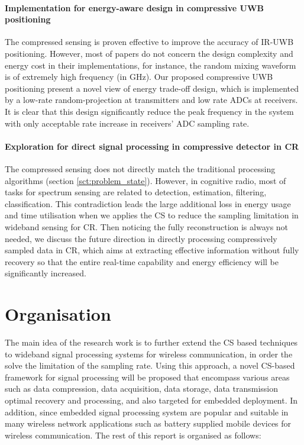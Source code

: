 \paragraph{Implementation for energy-aware design in compressive UWB positioning} 
The compressed sensing is proven effective to improve the accuracy of IR-UWB positioning. However, most of papers do not concern the design complexity and energy cost in their implementations, for instance, the random mixing waveform is of extremely high frequency (in GHz). Our proposed compressive UWB positioning present a novel view of energy trade-off design, which is implemented by a low-rate random-projection at transmitters and low rate ADCs at receivers. It is clear that this design significantly reduce the peak frequency in the system with only acceptable rate increase in receivers' ADC sampling rate. 

\paragraph{Exploration for direct signal processing in compressive detector in CR} 
The compressed sensing does not directly match the traditional processing algorithms (section \ref{sct:problem_state}). However, in cognitive radio, most of tasks for spectrum sensing are related to detection, estimation, filtering, classification. This contradiction leads the large additional loss in energy usage and time utilisation when we applies the CS to reduce the sampling limitation in wideband sensing for CR. Then noticing the fully reconstruction is always not needed, we discuss the future direction in directly processing compressively sampled data in CR, which aims at extracting effective information without fully recovery so that the entire real-time capability and energy efficiency will be significantly increased. 

\section{Organisation}
\indent \indent The main idea of the research work is to further extend the CS based techniques to wideband signal processing systems for wireless communication, in order the solve the limitation of the sampling rate. Using this approach, a novel CS-based framework for signal processing will be proposed that encompass various areas such as data compression, data acquisition, data storage, data transmission optimal recovery and processing, and also targeted for embedded deployment. In addition, since embedded signal processing system are popular and suitable in many wireless network applications such as battery supplied mobile devices for wireless communication. The rest of this report is organised as follows:

